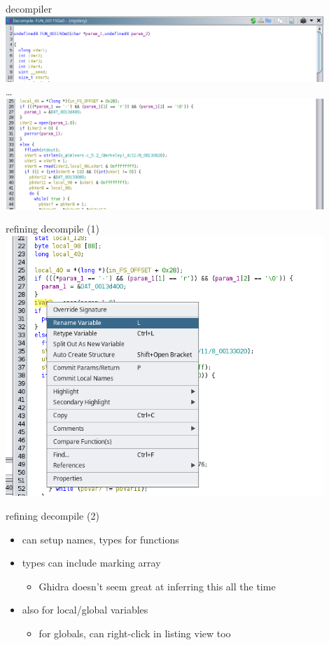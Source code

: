 \begin{frame}{decompiler}
\includegraphics[width=0.9\textwidth]{../re-tools/decomp-top} \\
\ldots  \\
\includegraphics[width=0.9\textwidth]{../re-tools/decomp-rest}
\end{frame}

\begin{frame}{refining decompile (1)}
\includegraphics[width=0.9\textwidth]{../re-tools/ghidra-edit-var-decomp}
\end{frame}

\begin{frame}{refining decompile (2)}
    \begin{itemize}
    \item can setup names, types for functions
    \item types can include marking array
        \begin{itemize}
        \item Ghidra doesn't seem great at inferring this all the time
        \end{itemize}
    \vspace{.5cm}
    \item also for local/global variables
        \begin{itemize}
        \item for globals, can right-click in listing view too
        \end{itemize}
    \end{itemize}
\end{frame}

